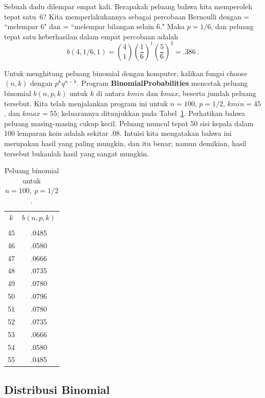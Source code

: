 \begin{example}\label{exam 3.11} Sebuah dadu dilempar empat kali.  Berapakah peluang
bahwa kita memperoleh tepat satu~6?  Kita memperlakukannya sebagai percobaan Bernoulli
dengan  = ``melempar 6" dan  = ``melempar bilangan
selain 6."  Maka $p = 1/6$, dan peluang tepat satu keberhasilan dalam empat percobaan
adalah
$$ b(4,1/6,1) = {4 \choose 1 }\left(\frac16\right)^1 \left(\frac56\right)^3 = .386\ .
$$
\end{example}

Untuk menghitung peluang binomial dengan komputer, kalikan fungsi choose$(n,k)$ dengan
$p^kq^{n - k}$.  Program {\bf BinomialProbabilities}
 mencetak peluang binomial $b(n, p, k)$ untuk $k$
di antara $kmin$ dan $kmax$, beserta jumlah peluang tersebut.  Kita telah menjalankan
program ini untuk $n = 100$, $p = 1/2$, $kmin = 45$, dan $kmax = 55$; keluarannya
ditunjukkan pada Tabel~\ref{table 3.27}.  Perhatikan bahwa peluang masing-masing cukup
kecil.  Peluang muncul tepat 50 sisi kepala dalam 100 lemparan koin adalah sekitar .08.
Intuisi kita mengatakan bahwa ini merupakan hasil yang paling mungkin, dan itu benar;
namun demikian, hasil tersebut bukanlah hasil yang sangat mungkin.

\begin{table}
\centering
\begin{tabular}{cc} $k$     & $b(n,p,k)$ \\
\\ 
45 & .0485 \\
46 & .0580 \\
47 & .0666 \\
48 & .0735 \\
49 & .0780 \\
50 & .0796 \\
51 & .0780 \\
52 & .0735 \\
53 & .0666 \\
54 & .0580 \\
55 & .0485 \\

\end{tabular}
\caption{Peluang binomial untuk $n = 100,\ p = 1/2$.}
\label{table 3.27}
\end{table}




\subsection*{Distribusi Binomial}


